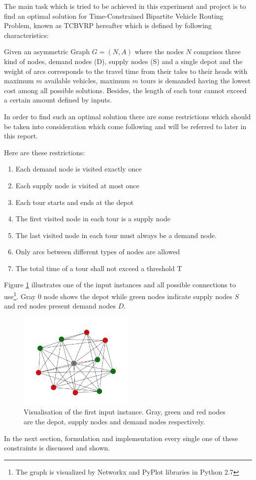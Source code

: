 The main task which is tried to be achieved in this experiment and project
is to find an optimal solution for Time-Constrained Bipartite Vehicle Routing
Problem, known as TCBVRP hereafter which is defined by following
characteristics:

Given an asymmetric Graph $G=(N,A)$ where the nodes $N$ comprises three kind of
nodes, demand nodes (D), supply nodes (S) and a single depot and the weight of
arcs corresponds to the travel time from their tales to their heads with maximum
$m$ available vehicles, maximum $m$ tours is demanded having the lowest cost
among all possible solutions. Besides, the length of each tour cannot exceed a
certain amount defined by inputs.

In order to find such an optimal solution there are some restrictions which
should be taken into consideration which come following and will be referred to
later in this report.

Here are these restrictions:

\begin{enumerate}
  \item Each demand node is visited exactly once
  \item Each supply node is visited at most once
  \item Each tour starts and ends at the depot
  \item The first visited node in each tour is a supply node
  \item The last visited node in each tour must always be a demand
node.
\item Only arcs between different types of nodes are allowed
\item The total time of a tour shall not exceed a threshold T
\end{enumerate}

Figure \ref{fig:vis} illustrates one of the input instances and all
possible connections to use\footnote{The graph is visualized by Networkx\cite{hagberg2004networkx}
and PyPlot libraries in Python 2.7}. Gray $0$ node shows the depot while green nodes indicate supply
nodes $S$ and red nodes present demand nodes $D$.

\begin{figure}[H]
  \centering
    \includegraphics[width=0.5\textwidth]{./figures/instance1.png}
    
  \caption{\label{fig:vis} Visualisation of the first input instance. Gray,
  green and red nodes are the depot, supply nodes and demand nodes
  respectively.}
  
\end{figure}

In the next section, formulation and implementation every single one of these
constraints is discussed and shown.
